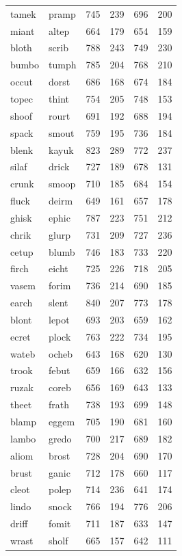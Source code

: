 \documentclass[
]{interact}
\begin{document}
\begin{longtable*}{llrrrr}
tamek & pramp & 745 & 239 & 696 & 200 \\ 
miant & altep & 664 & 179 & 654 & 159 \\ 
bloth & scrib & 788 & 243 & 749 & 230 \\ 
bumbo & tumph & 785 & 204 & 768 & 210 \\ 
occut & dorst & 686 & 168 & 674 & 184 \\ 
topec & thint & 754 & 205 & 748 & 153 \\ 
shoof & rourt & 691 & 192 & 688 & 194 \\ 
spack & smout & 759 & 195 & 736 & 184 \\ 
blenk & kayuk & 823 & 289 & 772 & 237 \\ 
silaf & drick & 727 & 189 & 678 & 131 \\ 
crunk & smoop & 710 & 185 & 684 & 154 \\ 
fluck & deirm & 649 & 161 & 657 & 178 \\ 
ghisk & ephic & 787 & 223 & 751 & 212 \\ 
chrik & glurp & 731 & 209 & 727 & 236 \\ 
cetup & blumb & 746 & 183 & 733 & 220 \\ 
firch & eicht & 725 & 226 & 718 & 205 \\ 
vasem & forim & 736 & 214 & 690 & 185 \\ 
earch & slent & 840 & 207 & 773 & 178 \\ 
blont & lepot & 693 & 203 & 659 & 162 \\ 
ecret & plock & 763 & 222 & 734 & 195 \\ 
wateb & ocheb & 643 & 168 & 620 & 130 \\ 
trook & febut & 659 & 166 & 632 & 156 \\ 
ruzak & coreb & 656 & 169 & 643 & 133 \\ 
theet & frath & 738 & 193 & 699 & 148 \\ 
blamp & eggem & 705 & 190 & 681 & 160 \\ 
lambo & gredo & 700 & 217 & 689 & 182 \\ 
aliom & brost & 728 & 204 & 690 & 170 \\ 
brust & ganic & 712 & 178 & 660 & 117 \\ 
cleot & polep & 714 & 236 & 641 & 174 \\ 
lindo & snock & 766 & 194 & 776 & 206 \\ 
driff & fomit & 711 & 187 & 633 & 147 \\ 
wrast & sholf & 665 & 157 & 642 & 111 \\ 

\end{longtable*}
\end{document}
